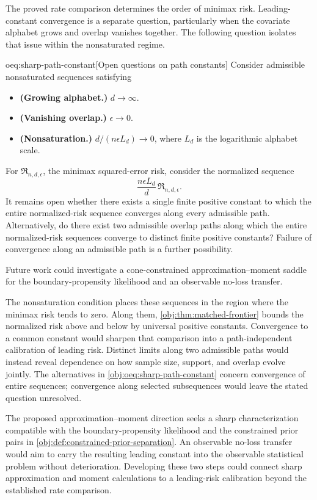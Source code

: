 \documentclass[11pt]{article}
\begin{document}
The proved rate comparison determines the order of minimax risk. Leading-constant convergence is a separate question, particularly when the covariate alphabet grows and overlap vanishes together. The following question isolates that issue within the nonsaturated regime.

\begin{remarkv}{oeq:sharp-path-constant}[Open questions on path constants]
Consider admissible nonsaturated sequences satisfying
\begin{itemize}
\item \textbf{(Growing alphabet.)} \(d\to\infty\).
\item \textbf{(Vanishing overlap.)} \(\epsilon\to0\).
\item \textbf{(Nonsaturation.)} \(d/(n\epsilon L_d)\to0\), where \(L_d\) is the logarithmic alphabet scale.
\end{itemize}
For \(\mathfrak R_{n,d,\epsilon}\), the minimax squared-error risk, consider the normalized sequence
\[
\frac{n\epsilon L_d}{d}\,\mathfrak R_{n,d,\epsilon}.
\]
It remains open whether there exists a single finite positive constant to which the entire normalized-risk sequence converges along every admissible path. Alternatively, do there exist two admissible overlap paths along which the entire normalized-risk sequences converge to distinct finite positive constants? Failure of convergence along an admissible path is a further possibility.

Future work could investigate a cone-constrained approximation--moment saddle for the boundary-propensity likelihood and an observable no-loss transfer.
\end{remarkv}

The nonsaturation condition places these sequences in the region where the minimax risk tends to zero. Along them, \cref{obj:thm:matched-frontier} bounds the normalized risk above and below by universal positive constants. Convergence to a common constant would sharpen that comparison into a path-independent calibration of leading risk. Distinct limits along two admissible paths would instead reveal dependence on how sample size, support, and overlap evolve jointly. The alternatives in \cref{obj:oeq:sharp-path-constant} concern convergence of entire sequences; convergence along selected subsequences would leave the stated question unresolved.

The proposed approximation--moment direction seeks a sharp characterization compatible with the boundary-propensity likelihood and the constrained prior pairs in \cref{obj:def:constrained-prior-separation}. An observable no-loss transfer would aim to carry the resulting leading constant into the observable statistical problem without deterioration. Developing these two steps could connect sharp approximation and moment calculations to a leading-risk calibration beyond the established rate comparison.
\end{document}

